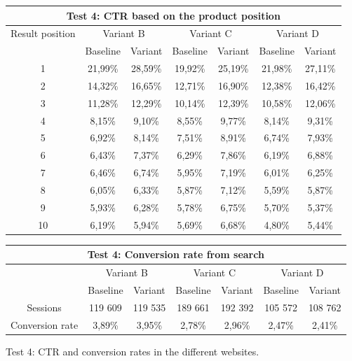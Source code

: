 \begin{figure}
    \centering
    
    \begin{tabular}{|c||c|c||c|c||c|c|}
    \hline
    \multicolumn{7}{|c|}{Test 4: CTR based on the product position} \\ \hline \hline
    \multirow{ 2}{4em}{Result position} & \multicolumn{2}{|c||}{Variant B} & \multicolumn{2}{|c||}{Variant C} & \multicolumn{2}{|c|}{Variant D} \\ \cline{2-7}
    & Baseline & Variant & Baseline & Variant & Baseline & Variant \\ \hline
    1 & 21,99\% & 28,59\% & 19,92\% & 25,19\% & 21,98\% & 27,11\% \\ \hline
    2 & 14,32\% & 16,65\% & 12,71\% & 16,90\% & 12,38\% & 16,42\% \\ \hline
    3 & 11,28\% & 12,29\% & 10,14\% & 12,39\% & 10,58\% & 12,06\% \\ \hline
    4 & 8,15\% & 9,10\% & 8,55\% & 9,77\% & 8,14\% & 9,31\% \\ \hline
    5 & 6,92\% & 8,14\% & 7,51\% & 8,91\% & 6,74\% & 7,93\% \\ \hline
    6 & 6,43\% & 7,37\% & 6,29\% & 7,86\% & 6,19\% & 6,88\% \\ \hline
    7 & 6,46\% & 6,74\% & 5,95\% & 7,19\% & 6,01\% & 6,25\% \\ \hline
    8 & 6,05\% & 6,33\% & 5,87\% & 7,12\% & 5,59\% & 5,87\% \\ \hline
    9 & 5,93\% & 6,28\% & 5,78\% & 6,75\% & 5,70\% & 5,37\% \\ \hline
    10 & 6,19\% & 5,94\% & 5,69\% & 6,68\% & 4,80\% & 5,44\% \\ \hline
    \end{tabular}
    
    \vspace{3mm}
    
    \begin{tabular}{|c||c|c||c|c||c|c|}
    \hline
    \multicolumn{7}{|c|}{Test 4: Conversion rate from search} \\ \hline \hline
    & \multicolumn{2}{|c||}{Variant B} & \multicolumn{2}{|c||}{Variant C} & \multicolumn{2}{|c|}{Variant D} \\ \cline{2-7}
    & Baseline & Variant & Baseline & Variant & Baseline & Variant \\ \hline
    Sessions & 119 609 & 119 535 & 189 661 & 192 392 & 105 572 & 108 762 \\ \hline
    Conversion rate & 3,89\% & 3,95\% & 2,78\% & 2,96\% & 2,47\% & 2,41\% \\ \hline
    \end{tabular}
    \caption{Test 4: CTR and conversion rates in the different websites.}
    \label{fig:search_v4}
\end{figure}


